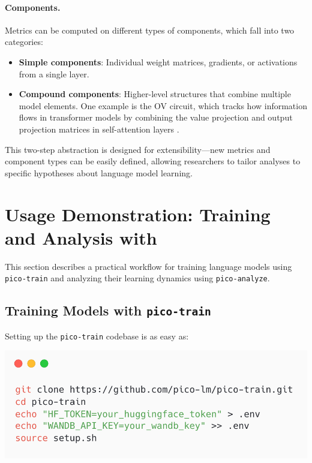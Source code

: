 {\paragraph{Components.} Metrics can be computed on different types of components, which fall into two categories: 
\begin{itemize} 
\item \textbf{Simple components}: Individual weight matrices, gradients, or activations from a single layer. 
\item \textbf{Compound components}: Higher-level structures that combine multiple model elements. One example is the OV circuit, which tracks how information flows in transformer models by combining the value projection and output projection matrices in self-attention layers \cite{elhage2021mathematical}. 
\end{itemize}

This two-step abstraction is designed for extensibility—new metrics and component types can be easily defined, allowing researchers to tailor analyses to specific hypotheses about language model learning. 


\section{Usage Demonstration: Training and Analysis with \picolarge}

This section describes a practical workflow for training language models using \texttt{pico-train} and analyzing their learning dynamics using \texttt{pico-analyze}.

\subsection{Training Models with \texttt{pico-train}}

Setting up the \texttt{pico-train} codebase is as easy as:

\begin{center}
    \includegraphics[width=0.7\columnwidth]{chapters/pico/figures/demo/demo_setup.png}
\end{center}

}
